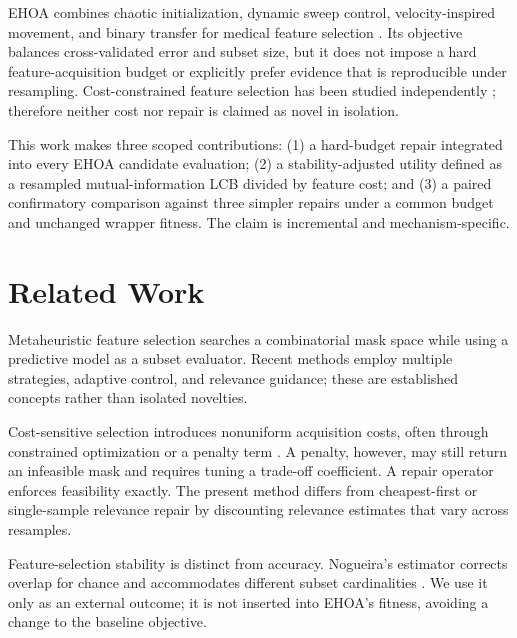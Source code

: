 \documentclass[10pt,journal,a4paper]{IEEEtran}
\begin{document}
EHOA combines chaotic initialization, dynamic sweep control, velocity-inspired movement, and binary transfer for medical feature selection \cite{hegazy2026}. Its objective balances cross-validated error and subset size, but it does not impose a hard feature-acquisition budget or explicitly prefer evidence that is reproducible under resampling. Cost-constrained feature selection has been studied independently \cite{jagdhuber2020}; therefore neither cost nor repair is claimed as novel in isolation.

This work makes three scoped contributions: (1) a hard-budget repair integrated into every EHOA candidate evaluation; (2) a stability-adjusted utility defined as a resampled mutual-information LCB divided by feature cost; and (3) a paired confirmatory comparison against three simpler repairs under a common budget and unchanged wrapper fitness. The claim is incremental and mechanism-specific.

\section{Related Work}
Metaheuristic feature selection searches a combinatorial mask space while using a predictive model as a subset evaluator. Recent methods employ multiple strategies, adaptive control, and relevance guidance; these are established concepts rather than isolated novelties.

Cost-sensitive selection introduces nonuniform acquisition costs, often through constrained optimization or a penalty term \cite{jagdhuber2020}. A penalty, however, may still return an infeasible mask and requires tuning a trade-off coefficient. A repair operator enforces feasibility exactly. The present method differs from cheapest-first or single-sample relevance repair by discounting relevance estimates that vary across resamples.

Feature-selection stability is distinct from accuracy. Nogueira's estimator corrects overlap for chance and accommodates different subset cardinalities \cite{nogueira2018}. We use it only as an external outcome; it is not inserted into EHOA's fitness, avoiding a change to the baseline objective.
\end{document}
